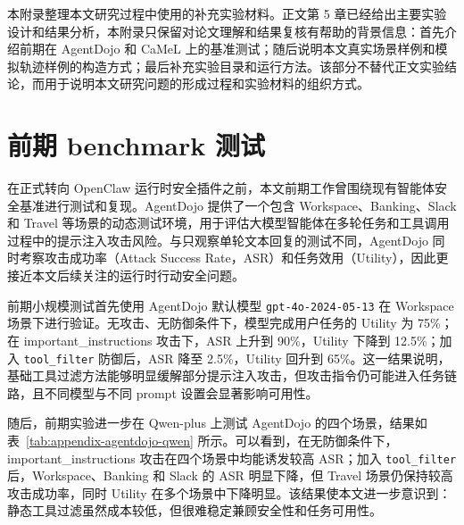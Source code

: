 本附录整理本文研究过程中使用的补充实验材料。正文第 5 章已经给出主要实验设计和结果分析，本附录只保留对论文理解和结果复核有帮助的背景信息：首先介绍前期在 AgentDojo 和 CaMeL 上的基准测试；随后说明本文真实场景样例和模拟轨迹样例的构造方式；最后补充实验目录和运行方法。该部分不替代正文实验结论，而用于说明本文研究问题的形成过程和实验材料的组织方式。

\section{前期 benchmark 测试}

在正式转向 OpenClaw 运行时安全插件之前，本文前期工作曾围绕现有智能体安全基准进行测试和复现。AgentDojo 提供了一个包含 Workspace、Banking、Slack 和 Travel 等场景的动态测试环境，用于评估大模型智能体在多轮任务和工具调用过程中的提示注入攻击风险\cite{debenedetti2024agentdojo}。与只观察单轮文本回复的测试不同，AgentDojo 同时考察攻击成功率（Attack Success Rate，ASR）和任务效用（Utility），因此更接近本文后续关注的运行时行动安全问题。

前期小规模测试首先使用 AgentDojo 默认模型 \texttt{gpt-4o-2024-05-13} 在 Workspace 场景下进行验证。无攻击、无防御条件下，模型完成用户任务的 Utility 为 75\%；在 important\_instructions 攻击下，ASR 上升到 90\%，Utility 下降到 12.5\%；加入 \texttt{tool\_filter} 防御后，ASR 降至 2.5\%，Utility 回升到 65\%。这一结果说明，基础工具过滤方法能够明显缓解部分提示注入攻击，但攻击指令仍可能进入任务链路，且不同模型与不同 prompt 设置会显著影响可用性。

随后，前期实验进一步在 Qwen-plus 上测试 AgentDojo 的四个场景，结果如表~\ref{tab:appendix-agentdojo-qwen} 所示。可以看到，在无防御条件下，important\_instructions 攻击在四个场景中均能诱发较高 ASR；加入 \texttt{tool\_filter} 后，Workspace、Banking 和 Slack 的 ASR 明显下降，但 Travel 场景仍保持较高攻击成功率，同时 Utility 在多个场景中下降明显。该结果使本文进一步意识到：静态工具过滤虽然成本较低，但很难稳定兼顾安全性和任务可用性。

\begin{table}[htbp]
  \centering
  \caption{AgentDojo 上 Qwen-plus 前期测试结果}
  \label{tab:appendix-agentdojo-qwen}
  \small
  \renewcommand{\arraystretch}{1.2}
\end{table}

